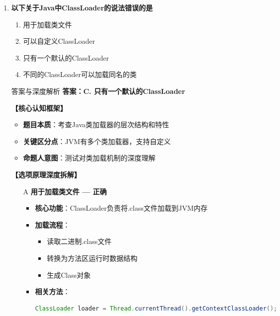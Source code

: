 \documentclass[12pt, a4paper]{ctexart}
\begin{document}
\begin{enumerate}[label=\textbf{\arabic*.}]
\begin{bluebox}{答案与深度解析}
		      \textbf{【命题趋势与实战策略】}
		      \textbf{考场秒杀}：看到关于反射的表述，注意"性能降低"通常是正确的
		      \textbf{注意事项}：本题答案C有争议，实际技术能力与答案不一致，需特别注意
	      \end{bluebox}

	      \vspace{1em}

	\item \textbf{以下关于Java中ClassLoader的说法错误的是}
	      \begin{enumerate}[label=\Alph*.]
		      \item 用于加载类文件
		      \item 可以自定义ClassLoader
		      \item 只有一个默认的ClassLoader
		      \item 不同的ClassLoader可以加载同名的类
	      \end{enumerate}

	      \begin{bluebox}{答案与深度解析}
		      \textbf{答案：C. 只有一个默认的ClassLoader}

		      \textbf{【核心认知框架】}
		      \begin{itemize}[label={}, leftmargin=*, nosep]
			      \item \textbf{题目本质}：考查Java类加载器的层次结构和特性
			      \item \textbf{关键区分点}：JVM有多个类加载器，支持自定义
			      \item \textbf{命题人意图}：测试对类加载机制的深度理解
		      \end{itemize}

		      \textbf{【选项原理深度拆解】}

		      \begin{itemize}[leftmargin=*, nosep, label={}]
			      \item[A] \textbf{用于加载类文件 — 正确}
			            \begin{itemize}[label={}, leftmargin=*, nosep]
				            \item \textbf{核心功能}：ClassLoader负责将.class文件加载到JVM内存
				            \item \textbf{加载流程}：
				                  \begin{itemize}[label={}, nosep]
					                  \item 读取二进制.class文件
					                  \item 转换为方法区运行时数据结构
					                  \item 生成Class对象
				                  \end{itemize}
				            \item \textbf{相关方法}：
				                  \begin{lstlisting}[language=Java]
ClassLoader loader = Thread.currentThread().getContextClassLoader();


\end{lstlisting}
\end{itemize}
\end{itemize}
\end{bluebox}
\end{enumerate}
\end{document}
